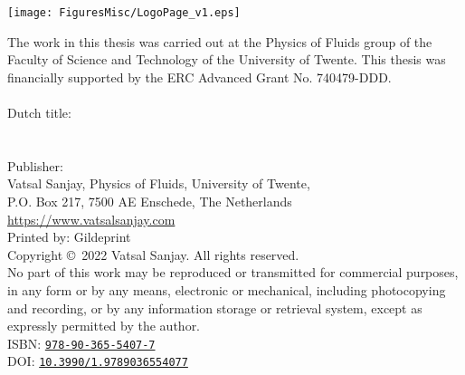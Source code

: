 {\centering\texttt{[image: FiguresMisc/LogoPage\_v1.eps]}}

\vspace{2.5mm}

\noindent The work in this thesis was carried out at the Physics of Fluids group of the Faculty of Science and Technology of the University of Twente. This thesis was financially supported by the ERC Advanced Grant No. 740479-DDD.\\
\vspace{2mm}\\
\noindent Dutch title: \\
\noindent\emph{\thesistitledutch}\\
\vspace{2mm}\\
\noindent Publisher:\\
Vatsal Sanjay, Physics of Fluids, University of Twente,\\
P.O. Box 217, 7500 AE Enschede, The Netherlands\\
\url{https://www.vatsalsanjay.com}\\
Printed by: Gildeprint
\vspace{2mm}\\
\noindent Copyright \copyright~2022 Vatsal Sanjay. All rights reserved.\\

\noindent No part of this work may be reproduced or transmitted for commercial purposes, in any form or by any means, electronic or mechanical, including photocopying and recording, or by any information storage or retrieval system, except as expressly permitted by the author.\\

\noindent ISBN: \href{https://doi.org/10.3990/1.9789036554077}{\texttt{978-90-365-5407-7}}\\
\noindent DOI: \href{https://doi.org/10.3990/1.9789036554077}{\texttt{10.3990/1.9789036554077}}

